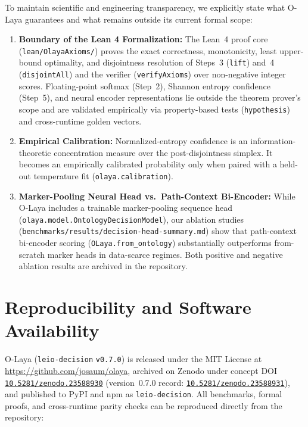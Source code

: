 \documentclass[11pt,a4paper]{article}
\begin{document}
To maintain scientific and engineering transparency, we explicitly state what O-Laya guarantees and what remains outside its current formal scope:
\begin{enumerate}[leftmargin=1.8em,itemsep=0.25em]
  \item \textbf{Boundary of the Lean 4 Formalization:} The Lean~4 proof core (\texttt{lean/OlayaAxioms/}) proves the exact correctness, monotonicity, least upper-bound optimality, and disjointness resolution of Steps~3 (\texttt{lift}) and~4 (\texttt{disjointAll}) and the verifier (\texttt{verifyAxioms}) over non-negative integer scores. Floating-point softmax (Step~2), Shannon entropy confidence (Step~5), and neural encoder representations lie outside the theorem prover's scope and are validated empirically via property-based tests (\texttt{hypothesis}) and cross-runtime golden vectors.
  \item \textbf{Empirical Calibration:} Normalized-entropy confidence is an information-theoretic concentration measure over the post-disjointness simplex. It becomes an empirically calibrated probability only when paired with a held-out temperature fit (\texttt{olaya.calibration}).
  \item \textbf{Marker-Pooling Neural Head vs.\ Path-Context Bi-Encoder:} While O-Laya includes a trainable marker-pooling sequence head (\texttt{olaya.model.OntologyDecisionModel}), our ablation studies (\texttt{benchmarks/results/decision-head-summary.md}) show that path-context bi-encoder scoring (\texttt{OLaya.from\_ontology}) substantially outperforms from-scratch marker heads in data-scarce regimes. Both positive and negative ablation results are archived in the repository.
\end{enumerate}

\section{Reproducibility and Software Availability}

O-Laya (\texttt{leio-decision} \texttt{v0.7.0}) is released under the MIT License at \url{https://github.com/josaum/olaya}, archived on Zenodo under concept DOI \href{https://doi.org/10.5281/zenodo.23588930}{\texttt{10.5281/zenodo.23588930}} (version~0.7.0 record: \href{https://zenodo.org/records/23588931}{\texttt{10.5281/zenodo.23588931}}), and published to PyPI and npm as \texttt{leio-decision}. All benchmarks, formal proofs, and cross-runtime parity checks can be reproduced directly from the repository:
\end{document}
